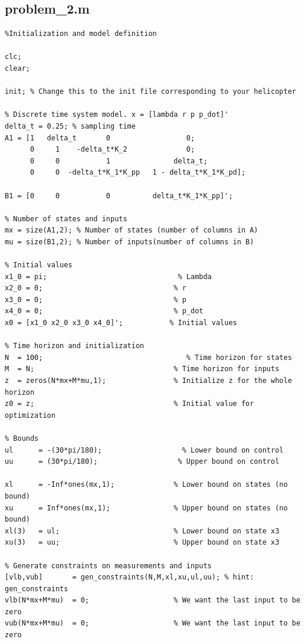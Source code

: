\subsection{problem\_2.m}\label{sec:p2}
\begin{verbatim}
%Initialization and model definition

clc;
clear;

init; % Change this to the init file corresponding to your helicopter

% Discrete time system model. x = [lambda r p p_dot]'
delta_t	= 0.25; % sampling time
A1 = [1   delta_t       0                  0;
      0     1    -delta_t*K_2              0;
      0     0           1               delta_t;
      0     0  -delta_t*K_1*K_pp   1 - delta_t*K_1*K_pd];
      
B1 = [0     0           0          delta_t*K_1*K_pp]';

% Number of states and inputs
mx = size(A1,2); % Number of states (number of columns in A)
mu = size(B1,2); % Number of inputs(number of columns in B)

% Initial values
x1_0 = pi;                               % Lambda
x2_0 = 0;                               % r
x3_0 = 0;                               % p
x4_0 = 0;                               % p_dot
x0 = [x1_0 x2_0 x3_0 x4_0]';           % Initial values

% Time horizon and initialization
N  = 100;                                  % Time horizon for states
M  = N;                                 % Time horizon for inputs
z  = zeros(N*mx+M*mu,1);                % Initialize z for the whole horizon
z0 = z;                                 % Initial value for optimization

% Bounds
ul 	    = -(30*pi/180);                   % Lower bound on control
uu 	    = (30*pi/180);                   % Upper bound on control

xl      = -Inf*ones(mx,1);              % Lower bound on states (no bound)
xu      = Inf*ones(mx,1);               % Upper bound on states (no bound)
xl(3)   = ul;                           % Lower bound on state x3
xu(3)   = uu;                           % Upper bound on state x3

% Generate constraints on measurements and inputs
[vlb,vub]       = gen_constraints(N,M,xl,xu,ul,uu); % hint: gen_constraints
vlb(N*mx+M*mu)  = 0;                    % We want the last input to be zero
vub(N*mx+M*mu)  = 0;                    % We want the last input to be zero


\end{verbatim}
